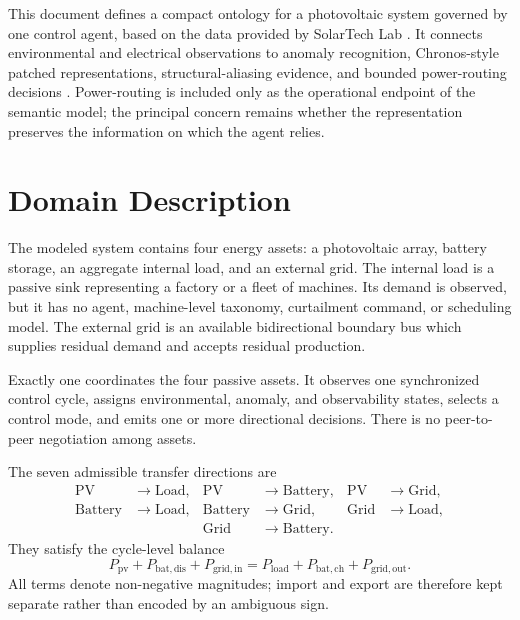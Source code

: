 This document defines a compact ontology for a photovoltaic system governed by one control agent, based on the data provided by SolarTech Lab \autocite{levaPhotovoltaicPowerWeather2020}. It connects environmental and electrical observations to anomaly recognition, Chronos-style patched representations, structural-aliasing evidence, and bounded power-routing decisions \autocite{ansariChronosLearningLanguage2024}. Power-routing is included only as the operational endpoint of the semantic model; the principal concern remains whether the representation preserves the information on which the agent relies.

\section{Domain Description}

The modeled system contains four energy assets: a photovoltaic array, battery storage, an aggregate internal load, and an external grid. The internal load is a passive sink representing a factory or a fleet of machines. Its demand is observed, but it has no agent, machine-level taxonomy, curtailment command, or scheduling model. The external grid is an available bidirectional boundary bus which supplies residual demand and accepts residual production.

Exactly one  coordinates the four passive assets. It observes one synchronized control cycle, assigns environmental, anomaly, and observability states, selects a control mode, and emits one or more directional decisions. There is no peer-to-peer negotiation among assets.

The seven admissible transfer directions are
\begin{equation}
\label{eq:routes}
\begin{aligned}
\mathrm{PV}&\rightarrow\mathrm{Load}, &
\mathrm{PV}&\rightarrow\mathrm{Battery}, &
\mathrm{PV}&\rightarrow\mathrm{Grid},\\
\mathrm{Battery}&\rightarrow\mathrm{Load}, &
\mathrm{Battery}&\rightarrow\mathrm{Grid}, &
\mathrm{Grid}&\rightarrow\mathrm{Load},\\
&&\mathrm{Grid}&\rightarrow\mathrm{Battery}.&&
\end{aligned}
\end{equation}
They satisfy the cycle-level balance
\begin{equation}
\label{eq:power-balance}
P_{\mathrm{pv}}+P_{\mathrm{bat,dis}}+P_{\mathrm{grid,in}}
=P_{\mathrm{load}}+P_{\mathrm{bat,ch}}+P_{\mathrm{grid,out}}.
\end{equation}
All terms denote non-negative magnitudes; import and export are therefore kept separate rather than encoded by an ambiguous sign.

